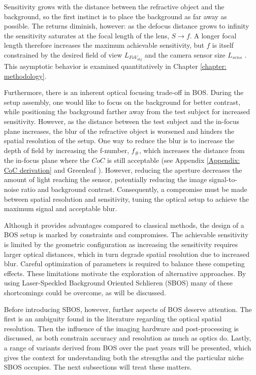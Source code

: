 \par Sensitivity grows with the distance between the refractive object and the background, so the first instinct is to place the background as far away as possible. The returns diminish, however: as the defocus distance grows to infinity the sensitivity saturates at the focal length of the lens, $S \rightarrow f$. A longer focal length therefore increases the maximum achievable sensitivity, but $f$ is itself constrained by the desired field of view $L_{FoV_{obj}}$ and the camera sensor size $L_{sens}$ \cite{Schmidt2025}. This asymptotic behavior is examined quantitatively in Chapter \ref{chapter: methodology}.

\par Furthermore, there is an inherent optical focusing trade-off in BOS. During the setup assembly, one would like to focus on the background for better contrast, while positioning the background farther away from the test subject for increased sensitivity. However, as the distance between the test subject and the in-focus plane increases, the blur of the refractive object is worsened and hinders the spatial resolution of the setup. One way to reduce the blur is to increase the depth of field by increasing the f-number, $f_\#$, which increases the distance from the in-focus plane where the $CoC$ is still acceptable (see Appendix \ref{Appendix: CoC derivation} and Greenleaf \cite{Greenleaf1950}). However, reducing the aperture decreases the amount of light reaching the sensor, potentially reducing the image signal-to-noise ratio and background contrast. Consequently, a compromise must be made between spatial resolution and sensitivity, tuning the optical setup to achieve the maximum signal and acceptable blur.

\par Although it provides advantages compared to classical methods, the design of a BOS setup is marked by constraints and compromises. The achievable sensitivity is limited by the geometric configuration as increasing the sensitivity requires larger optical distances, which in turn degrade spatial resolution due to increased blur. Careful optimization of parameters is required to balance these competing effects. These limitations motivate the exploration of alternative approaches. By using Laser-Speckled Background Oriented Schlieren (SBOS) many of these shortcomings could be overcome, as will be discussed.

\par Before introducing SBOS, however, further aspects of BOS deserve attention. The first is an ambiguity found in the literature regarding the optical spatial resolution. Then the influence of the imaging hardware and post-processing is discussed, as both constrain accuracy and resolution as much as optics do. Lastly, a range of variants derived from BOS over the past years will be presented, which gives the context for understanding both the strengths and the particular niche SBOS occupies. The next subsections will treat these matters.

